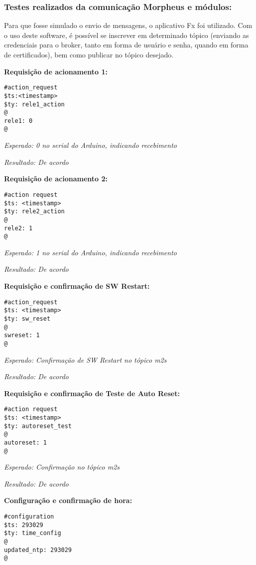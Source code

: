 \subsubsection{Testes realizados da comunicação Morpheus e módulos:}

Para que fosse simulado o envio de mensagens, o aplicativo \wmqtt Fx foi utilizado. Com o uso deste software, é possível se inscrever em determinado tópico (enviando as credenciais para o broker, tanto em forma de usuário e senha, quando em forma de certificados), bem como publicar no tópico desejado.

\textbf{Requisição de acionamento 1:}
\begin{lstlisting}
#action_request
$ts:<timestamp>
$ty: rele1_action
@
rele1: 0
@
\end{lstlisting}

\textit{Esperado: 0 no serial do Arduino, indicando recebimento}

\textit{Resultado: De acordo}

\textbf{Requisição de acionamento 2:}
\begin{lstlisting}
#action request
$ts: <timestamp>
$ty: rele2_action
@
rele2: 1
@
\end{lstlisting}

\textit{Esperado: 1 no serial do Arduino, indicando recebimento}

\textit{Resultado: De acordo}

\textbf{Requisição e confirmação de SW Restart:}
\begin{lstlisting}
#action_request
$ts: <timestamp>
$ty: sw_reset
@
swreset: 1
@
\end{lstlisting}

\textit{Esperado: Confirmação de SW Restart no tópico \wmqtt m2s}

\textit{Resultado: De acordo}

\textbf{Requisição e confirmação de Teste de Auto Reset:}
\begin{lstlisting}
#action request
$ts: <timestamp>
$ty: autoreset_test
@
autoreset: 1
@
\end{lstlisting}

\textit{Esperado: Confirmação no tópico \wmqtt m2s}

\textit{Resultado: De acordo}

\textbf{Configuração e confirmação de hora:}
\begin{lstlisting}
#configuration
$ts: 293029
$ty: time_config
@
updated_ntp: 293029
@
\end{lstlisting}

